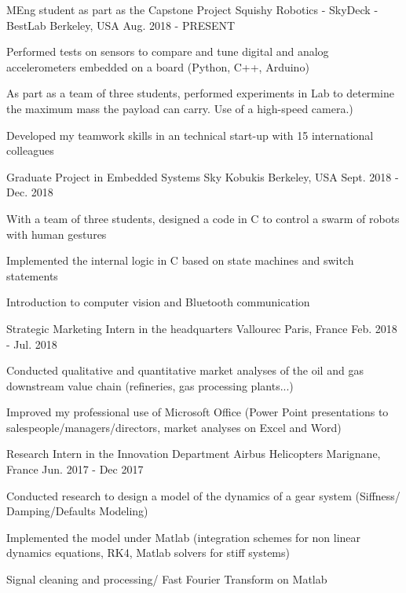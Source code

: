 \begin{cventries}

  \cventry
    {MEng student as part as the Capstone Project}
    {Squishy Robotics - SkyDeck - BestLab}
    {Berkeley, USA}
    {Aug. 2018 - PRESENT}
    {
      \begin{cvitems}
        \item {Performed tests on sensors to compare and tune digital and analog accelerometers embedded on a board (Python, C++, Arduino)}
         \item {As part as a team of three students, performed experiments in Lab to determine the maximum mass the payload can carry. Use of a high-speed camera.)}
        \item {Developed my teamwork skills in an technical start-up with 15 international colleagues}
      \end{cvitems}
    }
    
        \cventry
    {Graduate Project in Embedded Systems}
    {Sky Kobukis}
    {Berkeley, USA}
    {Sept. 2018 - Dec. 2018}
    {
      \begin{cvitems}
        \item {With a team of three students, designed a code in C to control a swarm of robots with human gestures}
        \item {Implemented the internal logic in C based on state machines and switch statements}
          \item {Introduction to computer vision and Bluetooth communication}
      \end{cvitems}
    }
    
      \cventry
    {Strategic Marketing Intern in the headquarters}
    {Vallourec}
    {Paris, France}
    {Feb. 2018 - Jul. 2018}
    {
      \begin{cvitems}
        \item {Conducted qualitative and quantitative market analyses of the oil and gas downstream value chain (refineries, gas processing plants...) }
        \item {Improved my professional use of Microsoft Office (Power Point presentations to salespeople/managers/directors, market analyses on Excel and Word)}
      \end{cvitems}
    }

    
     \cventry
    {Research Intern in the Innovation Department}
    {Airbus Helicopters}
    {Marignane, France}
    {Jun. 2017 - Dec 2017}
    {
      \begin{cvitems}
        \item {Conducted research to design a model of the dynamics of a gear system (Siffness/ Damping/Defaults Modeling)}
        \item {Implemented the model under Matlab (integration schemes for non linear dynamics equations, RK4, Matlab solvers for stiff systems)}
        \item {Signal cleaning and processing/ Fast Fourier Transform on Matlab}
      \end{cvitems}
    }


\end{cventries}
